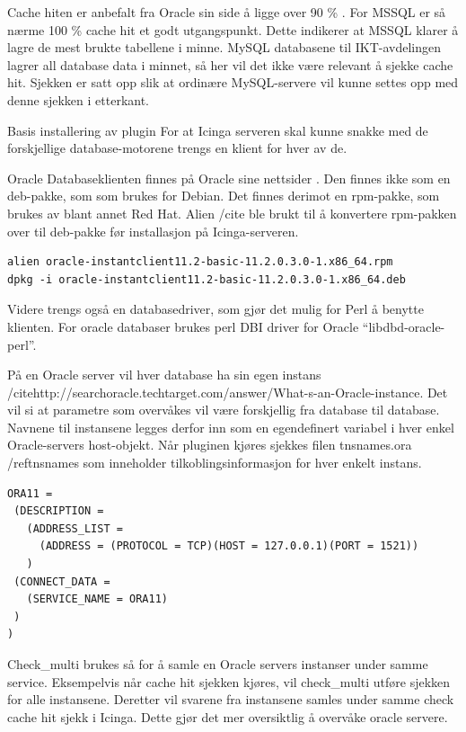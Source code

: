 Cache hiten er anbefalt fra Oracle sin side å ligge over 90 \% \cite{oraclecachehit}. 
For MSSQL er så nærme 100 \% cache hit et godt utgangspunkt. Dette indikerer at MSSQL klarer å lagre de mest brukte tabellene i minne. \cite{sqlmonitoring}
MySQL databasene til IKT-avdelingen lagrer all database data i minnet, så her vil det ikke være relevant å sjekke cache hit. Sjekken er satt opp slik at ordinære MySQL-servere vil kunne settes opp med denne sjekken i etterkant.

Basis installering av plugin 
For at Icinga serveren skal kunne snakke med de forskjellige database-motorene trengs en klient for hver av de. 

Oracle
Databaseklienten finnes på Oracle sine nettsider . Den finnes ikke som en deb-pakke, som som brukes for Debian. Det finnes derimot en rpm-pakke, som brukes av blant annet Red Hat. Alien /cite\cite{debian:alien} ble brukt til å konvertere rpm-pakken over til deb-pakke før installasjon på Icinga-serveren. 
\begin{lstlisting}
alien oracle-instantclient11.2-basic-11.2.0.3.0-1.x86_64.rpm 
dpkg -i oracle-instantclient11.2-basic-11.2.0.3.0-1.x86_64.deb
\end{lstlisting}
Videre trengs også en databasedriver, som gjør det mulig for Perl å benytte klienten. For oracle databaser brukes perl DBI driver for Oracle “libdbd-oracle-perl”.

På en Oracle server vil hver database ha sin egen instans /cite{http://searchoracle.techtarget.com/answer/What-s-an-Oracle-instance}. Det vil si at parametre som overvåkes vil være forskjellig fra database til database. Navnene til instansene legges derfor inn som en egendefinert variabel i hver enkel Oracle-servers host-objekt. Når pluginen kjøres sjekkes filen tnsnames.ora /ref{tnsnames} som inneholder tilkoblingsinformasjon for hver enkelt instans.
\begin{lstlisting}
ORA11 =
 (DESCRIPTION = 
   (ADDRESS_LIST =
     (ADDRESS = (PROTOCOL = TCP)(HOST = 127.0.0.1)(PORT = 1521))
   )
 (CONNECT_DATA =
   (SERVICE_NAME = ORA11)
 )
)
\end{lstlisting}
Check\_multi brukes så for å samle en Oracle servers instanser under samme service. Eksempelvis når cache hit sjekken kjøres, vil check\_multi utføre sjekken for alle instansene. Deretter vil svarene fra instansene samles under samme check cache hit sjekk i Icinga. Dette gjør det mer oversiktlig å overvåke oracle servere.

